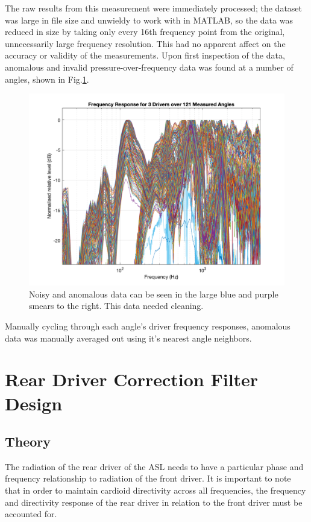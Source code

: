 \documentclass{report}
\begin{document}
        The raw results from this measurement were immediately processed; the dataset was large in file size and unwieldy to work with in MATLAB, so the data was reduced in size by taking only every 16th frequency point from the original, unnecessarily large frequency resolution.
        This had no apparent affect on the accuracy or validity of the measurements.
        Upon first inspection of the data, anomalous and invalid pressure-over-frequency data was found at a number of angles, shown in Fig.\ref{allAngles}.
        \begin{figure}[H]
            \centering
            \includegraphics[scale=0.35]{figs/allAngles.png}%
            \caption{Noisy and anomalous data can be seen in the large blue and purple smears to the right. This data needed cleaning.}
            \label{allAngles}
        \end{figure}
        Manually cycling through each angle's driver frequency responses, anomalous data was manually averaged out using it's nearest angle neighbors.

    \section{Rear Driver Correction Filter Design}
        \subsection{Theory}
            The radiation of the rear driver of the ASL needs to have a particular phase and frequency relationship to radiation of the front driver.
            It is important to note that in order to maintain cardioid directivity across all frequencies, the frequency and directivity response of the rear driver in relation to the front driver must be accounted for.
\end{document}
